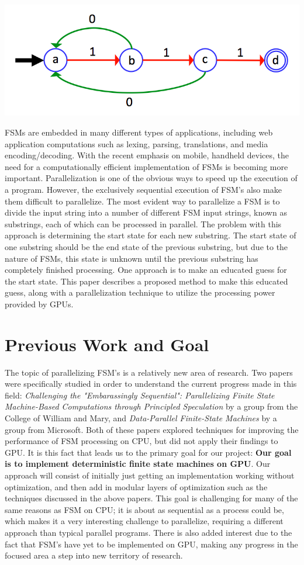 \documentclass{sigplanconf}
\begin{document}
\includegraphics[width=\linewidth]{fsm_diagram.png}

FSMs are embedded in many different types of applications, including web application computations such as lexing, parsing, translations, and media encoding/decoding. With the recent emphasis on mobile, handheld devices, the need for a computationally efficient implementation of FSMs is becoming more important. Parallelization is one of the obvious ways to speed up the execution of a program. However, the exclusively sequential execution of FSM's also make them difficult to parallelize. The most evident way to parallelize a FSM is to divide the input string into a number of different FSM input strings, known as substrings, each of which can be processed in parallel. The problem with this approach is determining the start state for each new substring. The start state of one substring should be the end state of the previous substring, but due to the nature of FSMs, this state is unknown until the previous substring has completely finished processing. One approach is to make an educated guess for the start state. This paper describes a proposed method to make this educated guess, along with a parallelization technique to utilize the processing power provided by GPUs.

\section{Previous Work and Goal}
The topic of parallelizing FSM's is a relatively new area of research. Two papers were specifically studied in order to understand the current progress made in this field: \textit{Challenging the "Embarassingly Sequential": Parallelizing Finite State Machine-Based Computations through Principled Speculation} by a group from the College of William and Mary, and \textit{Data-Parallel Finite-State Machines} by a group from Microsoft. Both of these papers explored techniques for improving the performance of FSM processing on CPU, but did not apply their findings to GPU. It is this fact that leads us to the primary goal for our project: \textbf{Our goal is to implement deterministic finite state machines on GPU}. Our approach will consist of initially just getting an implementation working without optimization, and then add in modular layers of optimization such as the techniques discussed in the above papers. This goal is challenging for many of the same reasons as FSM on CPU; it is about as sequential as a process could be, which makes it a very interesting challenge to parallelize, requiring a different approach than typical parallel programs. There is also added interest due to the fact that FSM's have yet to be implemented on GPU, making any progress in the focused area a step into new territory of research.
\end{document}
